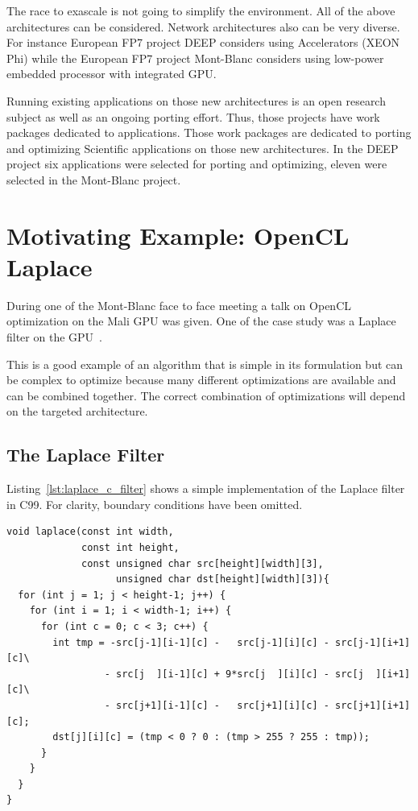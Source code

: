 \documentclass[11pt, a4paper, twoside]{montblanc}
\begin{document}
The race to exascale is not going to simplify the environment. All of the above
architectures can be considered. Network architectures also can be very
diverse.  For instance European FP7 project DEEP considers using Accelerators
(XEON Phi) while the European FP7 project Mont-Blanc considers using low-power
embedded processor with integrated GPU.

Running existing applications on those new architectures is an open research
subject as well as an ongoing porting effort.  Thus, those projects have work
packages dedicated to applications. Those work packages are dedicated to porting
and optimizing Scientific applications on those new architectures. In the DEEP
project six applications were selected for porting and optimizing, eleven were
selected in the Mont-Blanc project.

\section{Motivating Example: OpenCL Laplace}
\label{sec:laplace}

During one of the Mont-Blanc face to face meeting a talk on OpenCL optimization
on the Mali GPU was given. One of the case study was a Laplace filter on the
GPU~\cite{opencl_arm_training}.

This is a good example of an algorithm that is simple in its formulation but
can be complex to optimize because many different optimizations are available
and can be combined together. The correct combination of optimizations will
depend on the targeted architecture.

\subsection{The Laplace Filter}

Listing~\ref{lst:laplace_c_filter} shows a simple implementation of the Laplace
filter in C99. For clarity, boundary conditions have been omitted.

\begin{lstlisting}
void laplace(const int width,
             const int height,
             const unsigned char src[height][width][3],
                   unsigned char dst[height][width][3]){
  for (int j = 1; j < height-1; j++) {
    for (int i = 1; i < width-1; i++) {
      for (int c = 0; c < 3; c++) {
        int tmp = -src[j-1][i-1][c] -   src[j-1][i][c] - src[j-1][i+1][c]\
                 - src[j  ][i-1][c] + 9*src[j  ][i][c] - src[j  ][i+1][c]\
                 - src[j+1][i-1][c] -   src[j+1][i][c] - src[j+1][i+1][c];
        dst[j][i][c] = (tmp < 0 ? 0 : (tmp > 255 ? 255 : tmp));
      }
    }
  }
}
\end{lstlisting}
\end{document}
